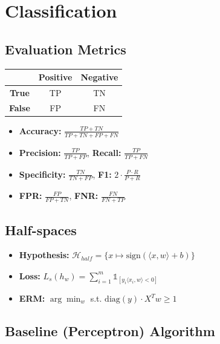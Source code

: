 \section{Classification}

\subsection{Evaluation Metrics}
\begin{center}
    \renewcommand{\arraystretch}{1.15}
    \begin{tabular}{|c|c|c|}
        \hline
                       & \textbf{Positive} & \textbf{Negative} \\
        \hline
        \textbf{True}  & TP                & TN                \\
        \hline
        \textbf{False} & FP                & FN                \\
        \hline
    \end{tabular}
\end{center}

\begin{itemize}
    \item \textbf{Accuracy:} $\frac{TP + TN}{TP + TN + FP + FN}$
    \item \textbf{Precision:} $\frac{TP}{TP + FP}$, \textbf{Recall:} $\frac{TP}{TP + FN}$
    \item \textbf{Specificity:} $\frac{TN}{TN + FP}$, \textbf{F1:} $2 \cdot \frac{P \cdot R}{P + R}$
    \item \textbf{FPR:} $\frac{FP}{FP + TN}$, \textbf{FNR:} $\frac{FN}{FN + TP}$
\end{itemize}

\subsection{Half-spaces}
\begin{itemize}
    \item \textbf{Hypothesis:} $\mathcal{H}_{\mathit{half}} = \{x \mapsto \mathrm{sign}(\langle x, w \rangle + b)\}$
    \item \textbf{Loss:} $L_s(h_w) = \sum_{i=1}^m \mathds{1}_{[y_i \langle x_i, w \rangle < 0]}$
    \item \textbf{ERM:} $\arg\min_w$ s.t. $\mathrm{diag}(y) \cdot X^T w \geq 1$
\end{itemize}

\subsection{Baseline (Perceptron) Algorithm}

